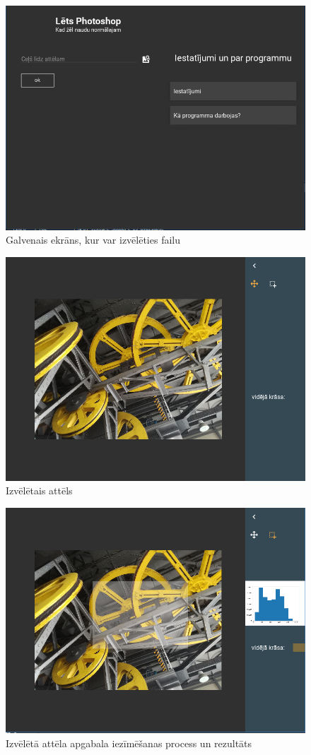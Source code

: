 \documentclass{article}
\begin{document}
\begin{figure}[htbp]
    \centering
    \includegraphics[width=\textwidth]{main_logs.png}
    \caption{Galvenais ekrāns, kur var izvēlēties failu}
    \label{fig:my_label}
\end{figure}

\begin{figure}[htbp]
    \centering
    \includegraphics[width=\textwidth]{atverts_attels.png}
    \caption{Izvēlētais attēls}
    \label{fig:my_label}
\end{figure}

\begin{figure}[htbp]
    \centering
    \includegraphics[width=\textwidth]{iezimets.png}
    \caption{Izvēlētā attēla apgabala iezīmēšanas process un rezultāts}
    \label{fig:my_label}
\end{figure}
\end{document}
